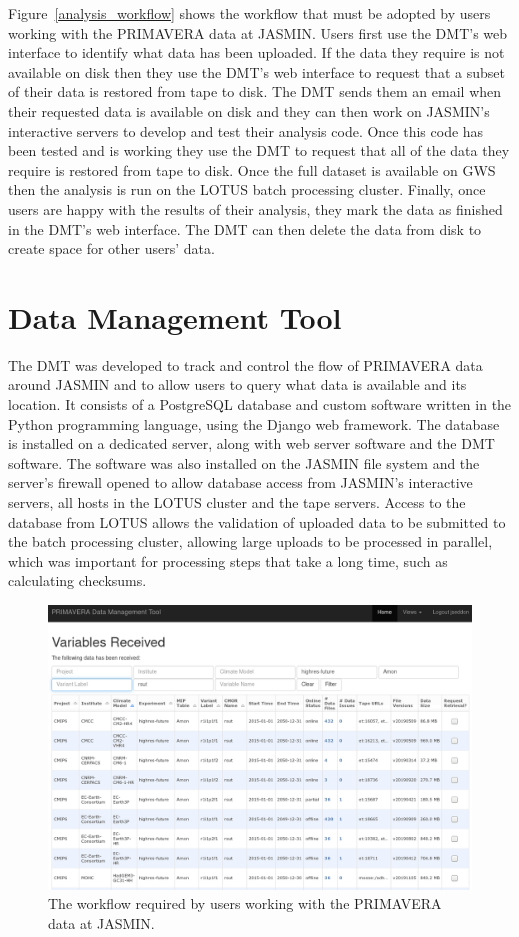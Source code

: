\documentclass[gmd, manuscript]{copernicus}
\begin{document}
Figure~\ref{analysis_workflow} shows the workflow that must be adopted by users working with the PRIMAVERA data at JASMIN. Users first use the DMT's web interface to identify what data has been uploaded. If the data they require is not available on disk then they use the DMT's web interface to request that a subset of their data is restored from tape to disk. The DMT sends them an email when their requested data is available on disk and they can then work on JASMIN's interactive servers to develop and test their analysis code. Once this code has been tested and is working they use the DMT to request that all of the data they require is restored from tape to disk. Once the full dataset is available on GWS then the analysis is run on the LOTUS batch processing cluster. Finally, once users are happy with the results of their analysis, they mark the data as finished in the DMT's web interface. The DMT can then delete the data from disk to create space for other users' data.

\section{Data Management Tool}

The DMT was developed to track and control the flow of PRIMAVERA data around JASMIN and to allow users to query what data is available and its location. It consists of a PostgreSQL database and custom software written in the Python programming language, using the Django web framework. The database is installed on a dedicated server, along with web server software and the DMT software. The software was also installed on the JASMIN file system and the server's firewall opened to allow database access from JASMIN's interactive servers, all hosts in the LOTUS cluster and the tape servers. Access to the database from LOTUS allows the validation of uploaded data to be submitted to the batch processing cluster, allowing large uploads to be processed in parallel, which was important for processing steps that take a long time, such as calculating checksums.

\begin{figure}[t]
	\includegraphics[width=12cm]{fig03.png}
	\caption{The workflow required by users working with the PRIMAVERA data at JASMIN.}
	\label{dmt_query}
\end{figure}
\end{document}
